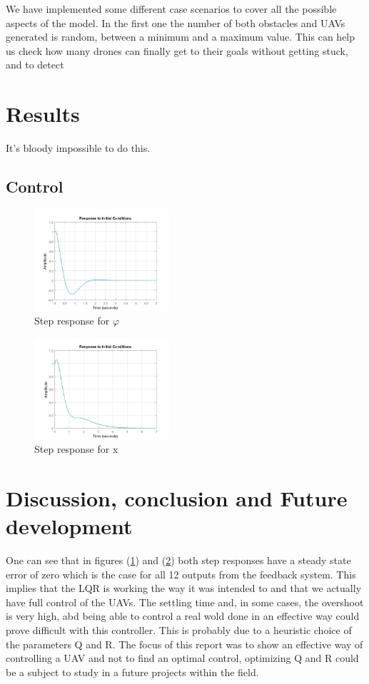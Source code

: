 \documentclass[journal]{IEEEtran}
\begin{document}
	We have implemented some different case scenarios to cover all the possible aspects of the model. In the first one the number of both obstacles and UAVs generated is random, between a minimum and a maximum value. This can help us check how many drones can finally get to their goals without getting stuck, and to detect 
	
	\section{Results}
	It's bloody impossible to do this.
	\subsection{Control}
		\begin{figure}[h]
  			\centering
  			\includegraphics[width=5cm]{Results/Controll/Fig1}
  			\caption{Step response for $\varphi$}
  			\label{fig:contresphi}
		\end{figure}	
		
		\begin{figure}[h]
  			\centering
  			\includegraphics[width=5cm]{Results/Controll/Fig12}
  			\caption{Step response for x}
  			\label{fig:contresx}
		\end{figure}	
		
		
		
	\section{Discussion, conclusion and Future development}
	One can see that in figures  (\ref{fig:contresphi}) and (\ref{fig:contresx}) both step responses have a steady state error of zero which is the case for all 12 outputs from the feedback system. This implies that the LQR is working the way it was intended to and that we actually have full control of the UAVs.  The settling time and, in some cases, the overshoot is very high, abd being able to control a real wold done in an effective way could prove difficult with this controller. This is probably due to a heuristic choice of the parameters Q and R. The focus of this report was to show an effective way of controlling a UAV and not to find an optimal control, optimizing Q and R could be a subject to study in a  future projects within the field.
\end{document}
